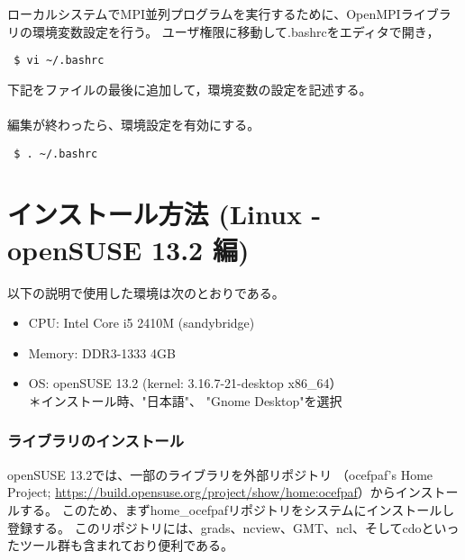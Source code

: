 ローカルシステムでMPI並列プログラムを実行するために、OpenMPIライブラリの環境変数設定を行う。
ユーザ権限に移動して.bashrcをエディタで開き，
\begin{verbatim}
 $ vi ~/.bashrc
\end{verbatim}
下記をファイルの最後に追加して，環境変数の設定を記述する。\\

{\gt
{}}\\

編集が終わったら、環境設定を有効にする。
\begin{verbatim}
 $ . ~/.bashrc
\end{verbatim}


\section{インストール方法 (Linux - openSUSE 13.2 編)}

以下の説明で使用した環境は次のとおりである。
\begin{itemize}
\item CPU: Intel Core i5 2410M (sandybridge)
\item Memory: DDR3-1333 4GB
\item OS: openSUSE 13.2 (kernel: 3.16.7-21-desktop x86\_64）\\
{\small ＊インストール時、"日本語"、 "Gnome Desktop"を選択}
\end{itemize}

\subsubsection{ライブラリのインストール}

openSUSE 13.2では、一部のライブラリを外部リポジトリ
（ocefpaf's Home Project; \url{https://build.opensuse.org/project/show/home:ocefpaf}）からインストールする。
このため、まずhome\_ocefpafリポジトリをシステムにインストールし登録する。
このリポジトリには、grads、ncview、GMT、ncl、そしてcdoといったツール群も含まれており便利である。


